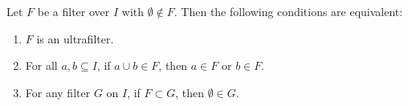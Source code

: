 Let $F$ be a filter over $I$ with $\emptyset \notin F$. Then the following conditions are equivalent:

\begin{enumerate}
\item[(i)] $F$ is an ultrafilter.
\item[(ii)] For all $a, b \subseteq I$, if $a \cup b \in F$, then $a \in F$ or $b \in F$.
\item[(iii)] For any filter $G$ on $I$, if $F \subset G$, then $\emptyset \in G$.
\end{enumerate}
